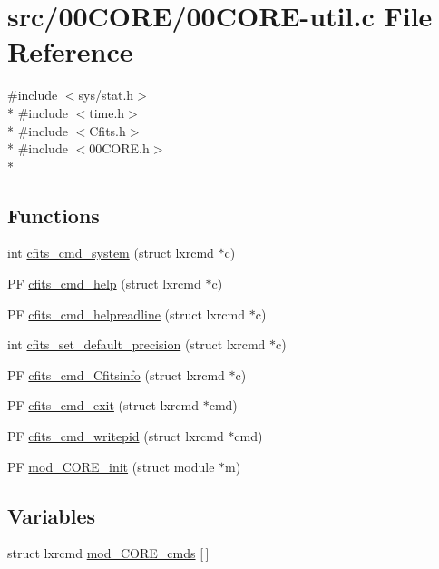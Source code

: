 \hypertarget{00CORE-util_8c}{\section{src/00\+C\+O\+R\+E/00\+C\+O\+R\+E-\/util.c File Reference}
\label{00CORE-util_8c}
}
{\ttfamily \#include $<$sys/stat.\+h$>$}\\*
{\ttfamily \#include $<$time.\+h$>$}\\*
{\ttfamily \#include $<$Cfits.\+h$>$}\\*
{\ttfamily \#include $<$00\+C\+O\+R\+E.\+h$>$}\\*
\subsection*{Functions}
\begin{DoxyCompactItemize}
\item 
int \hyperlink{00CORE-util_8c_a5c347013d2321007a39b35479a004a98}{cfits\+\_\+cmd\+\_\+system} (struct lxrcmd $\ast$c)
\item 
P\+F \hyperlink{00CORE-util_8c_adcad0b09bdc39ca886929037370e91e3}{cfits\+\_\+cmd\+\_\+help} (struct lxrcmd $\ast$c)
\item 
P\+F \hyperlink{00CORE-util_8c_aae63cebb1c60093a659435e992688824}{cfits\+\_\+cmd\+\_\+helpreadline} (struct lxrcmd $\ast$c)
\item 
int \hyperlink{00CORE-util_8c_af99a7b6fc82ebc9772ed71420e79e4ba}{cfits\+\_\+set\+\_\+default\+\_\+precision} (struct lxrcmd $\ast$c)
\item 
P\+F \hyperlink{00CORE-util_8c_a9f914b00beb9aca409d72a7e61b35cd8}{cfits\+\_\+cmd\+\_\+\+Cfitsinfo} (struct lxrcmd $\ast$c)
\item 
P\+F \hyperlink{00CORE-util_8c_a71ac14b0fd01ac9ec195dfaf9770051f}{cfits\+\_\+cmd\+\_\+exit} (struct lxrcmd $\ast$cmd)
\item 
P\+F \hyperlink{00CORE-util_8c_a73a58102b0bf4d2351ab96a614a25e87}{cfits\+\_\+cmd\+\_\+writepid} (struct lxrcmd $\ast$cmd)
\item 
P\+F \hyperlink{00CORE-util_8c_a41cdcd744da71a393cd0174d3554213b}{mod\+\_\+C\+O\+R\+E\+\_\+init} (struct module $\ast$m)
\end{DoxyCompactItemize}
\subsection*{Variables}
\begin{DoxyCompactItemize}
\item 
struct lxrcmd \hyperlink{00CORE-util_8c_a30a1fdbdb3486e487be580824d331721}{mod\+\_\+C\+O\+R\+E\+\_\+cmds} \mbox{[}$\,$\mbox{]}
\end{DoxyCompactItemize}


